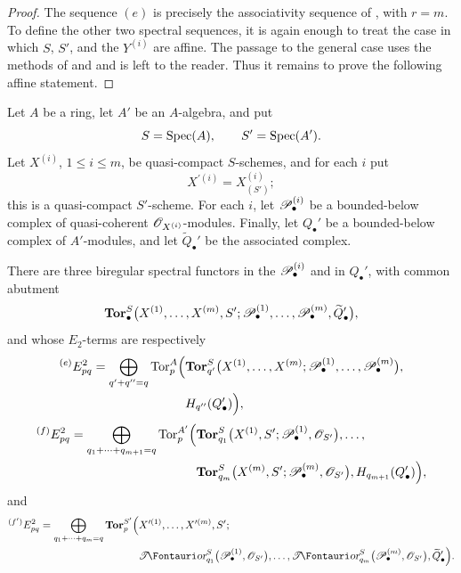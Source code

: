 \begin{proof}
The sequence $(e)$ is precisely the associativity sequence of
, with $r=m$.  To define the other two spectral
sequences, it is again enough to treat the case in which $S$, $S'$,
and the $Y^{(i)}$ are affine.  The passage to the general case uses
the methods of  and  and is left to
the reader.  Thus it remains to prove the following affine
statement.
\end{proof}

\begin{corollary}[6.9.4]
\label{III.6.9.4}
Let $A$ be a ring, let $A'$ be an $A$-algebra, and put
\[
  S=\operatorname{Spec}(A),
  \qquad
  S'=\operatorname{Spec}(A').
\]
Let $X^{(i)}$, $1\leq i\leq m$, be quasi-compact $S$-schemes, and
for each $i$ put
\[
  X^{\prime(i)}=X_{(S')}^{(i)};
\]
this is a quasi-compact $S'$-scheme.  For each $i$, let
$\mathscr{P}_\bullet^{(i)}$ be a bounded-below complex of quasi-coherent
$\mathscr{O}_{X^{(i)}}$-modules.  Finally, let $Q_\bullet'$ be a
bounded-below complex of $A'$-modules, and let
$\widetilde Q_\bullet'$ be the associated complex.

There are three biregular spectral functors in the
$\mathscr{P}_\bullet^{(i)}$ and in $Q_\bullet'$, with common abutment
\[
  \mathbf{Tor}_\bullet^S
  \bigl(
    X^{(1)},\ldots,X^{(m)},S';
    \mathscr{P}_\bullet^{(1)},\ldots,\mathscr{P}_\bullet^{(m)},
    \widetilde Q_\bullet'
  \bigr),
\]
and whose $E_2$-terms are respectively
\[
\begin{split}
  {}^{(e)}E_{pq}^2
  =
  \bigoplus_{q'+q''=q}
  \operatorname{Tor}_p^A
  \Bigl(
    &
    \mathbf{Tor}_{q'}^S
    \bigl(
      X^{(1)},\ldots,X^{(m)};
      \mathscr{P}_\bullet^{(1)},\ldots,\mathscr{P}_\bullet^{(m)}
    \bigr),
    \\
    &
    H_{q''}(Q_\bullet')
  \Bigr),
\end{split}
\]
\[
\begin{split}
  {}^{(f)}E_{pq}^2
  =
  \bigoplus_{q_1+\cdots+q_{m+1}=q}
  \operatorname{Tor}_p^{A'}
  \Bigl(
    &
    \mathbf{Tor}_{q_1}^S
    \bigl(
      X^{(1)},S';
      \mathscr{P}_\bullet^{(1)},\mathscr{O}_{S'}
    \bigr),
    \ldots,
    \\
    &
    \mathbf{Tor}_{q_m}^S
    \bigl(
      X^{(m)},S';
      \mathscr{P}_\bullet^{(m)},\mathscr{O}_{S'}
    \bigr),
    H_{q_{m+1}}(Q_\bullet')
  \Bigr),
\end{split}
\]
and
\[
\begin{split}
  {}^{(f')}E_{pq}^2
  =
  \bigoplus_{q_1+\cdots+q_m=q}
  \mathbf{Tor}_p^{S'}
  \Bigl(
    &
    X^{\prime(1)},\ldots,X^{\prime(m)},S';
    \\
    &
    \shTor_{q_1}^S
    \bigl(
      \sh P_\bullet^{(1)},\sh O_{S'}
    \bigr),
    \ldots,
    \shTor_{q_m}^S
    \bigl(
      \sh P_\bullet^{(m)},\sh O_{S'}
    \bigr),
    \widetilde Q_\bullet'
  \Bigr).
\end{split}
\]
\end{corollary}

